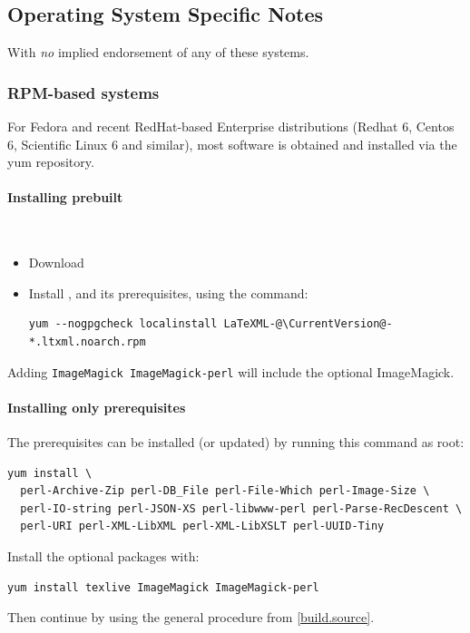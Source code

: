 \documentclass{article}
\begin{document}
\subsection[OS-Specific Notes]{Operating System Specific Notes}\label{install.osnotes}
With \emph{no} implied endorsement of any of these systems.

\subsubsection[RPM-based systems]{RPM-based systems}\label{install.fedora}
For Fedora and recent RedHat-based Enterprise distributions
(Redhat 6, Centos 6, Scientific Linux 6 and similar),
most software is obtained and installed via the yum repository.

\paragraph{Installing prebuilt}\\
\begin{itemize}
\item Download \CurrentFedora
\item Install \LaTeXML, and its prerequisites, using the command:
\begin{lstlisting}[style=shell]
yum --nogpgcheck localinstall LaTeXML-@\CurrentVersion@-*.ltxml.noarch.rpm
\end{lstlisting}
\end{itemize}
Adding \texttt{ImageMagick ImageMagick-perl} will include the optional ImageMagick.

\paragraph{Installing only prerequisites}
The prerequisites can be installed (or updated) by running this command as root: 
\begin{lstlisting}[style=shell]
yum install \
  perl-Archive-Zip perl-DB_File perl-File-Which perl-Image-Size \
  perl-IO-string perl-JSON-XS perl-libwww-perl perl-Parse-RecDescent \
  perl-URI perl-XML-LibXML perl-XML-LibXSLT perl-UUID-Tiny
\end{lstlisting}
Install the optional packages with:
\begin{lstlisting}[style=shell]
yum install texlive ImageMagick ImageMagick-perl
\end{lstlisting}
Then continue by using the general procedure from \ref{build.source}.
\end{document}
